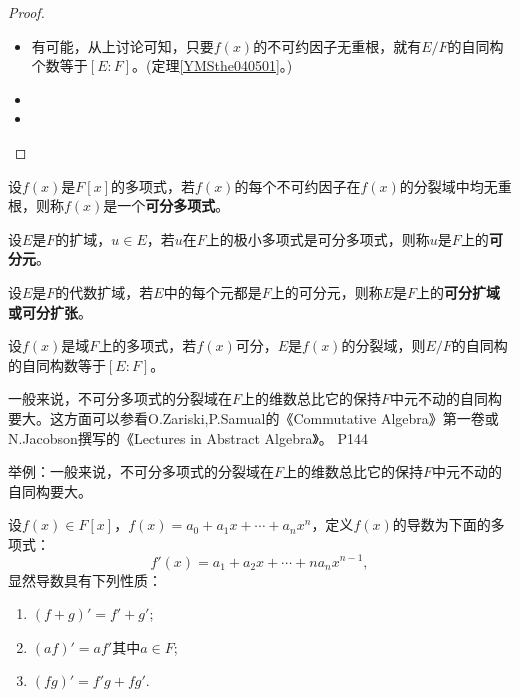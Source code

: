 \begin{proof}
	\begin{itemize}
		\item 有可能，从上讨论可知，只要$f(x)$的不可约因子无重根，就有$E/F$的自同构个数等于$[E:F]$。(定理\ref{YMSthe040501}。)
		\item
		\item
	\end{itemize}
\end{proof}

\begin{definition}
	设$f(x)$是$F[x]$的多项式，若$f(x)$的每个不可约因子在$f(x)$的分裂域中均无重根，则称$f(x)$是一个\textbf{可分多项式}。
\end{definition}

\begin{definition}
	设$E$是$F$的扩域，$u\in E$，若$u$在$F$上的极小多项式是可分多项式，则称$u$是$F$上的\textbf{可分元}。
\end{definition}

\begin{definition}
	设$E$是$F$的代数扩域，若$E$中的每个元都是$F$上的可分元，则称$E$是$F$上的\textbf{可分扩域或可分扩张}。
\end{definition}


\begin{theorem}\label{YMSthe040501}
	设$f(x)$是域$F$上的多项式，若$f(x)$可分，$E$是$f(x)$的分裂域，则$E/F$的自同构的自同构数等于$[E:F]$。
\end{theorem}

\original
{
	一般来说，不可分多项式的分裂域在$F$上的维数总比它的保持$F$中元不动的自同构要大。这方面可以参看O.Zariski,P.Samual的《Commutative Algebra》第一卷或N.Jacobson撰写的《Lectures in Abstract Algebra》。
}
{P144}
\begin{proposition}
	举例：一般来说，不可分多项式的分裂域在$F$上的维数总比它的保持$F$中元不动的自同构要大。
\end{proposition}


\begin{definition}
	设$f(x)\in F[x]$，$f(x)=a_{0}+a_{1}x+\cdots +a_{n}x^{n}$，定义$f(x)$的导数为下面的多项式：
	\begin{equation*}
		f'(x)=a_{1}+a_{2}x+\cdots +na_{n}x^{n-1},
	\end{equation*}
	显然导数具有下列性质：
	\begin{enumerate}
		\item $(f+g)'=f'+g'$;
		\item $(af)'=af'$其中$a\in F $;
		\item $(fg)'=f'g+fg' $.
	\end{enumerate}
\end{definition}

